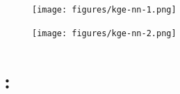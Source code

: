 \documentclass[presentation]{beamer}\mode<presentation>{\usetheme{AMSBolognaFC}}
\begin{document}
\begin{frame}[allowframebreaks]{\skilong}
{        \framebreak
        
        \begin{figure}
            \centering
            \texttt{[image: figures/kge-nn-1.png]}
        \end{figure}
        
        \begin{figure}
            \centering
            \texttt{[image: figures/kge-nn-2.png]}
        \end{figure}
    }
    
\end{frame}

\section{\killshort{}: \killlong}
\end{document}
